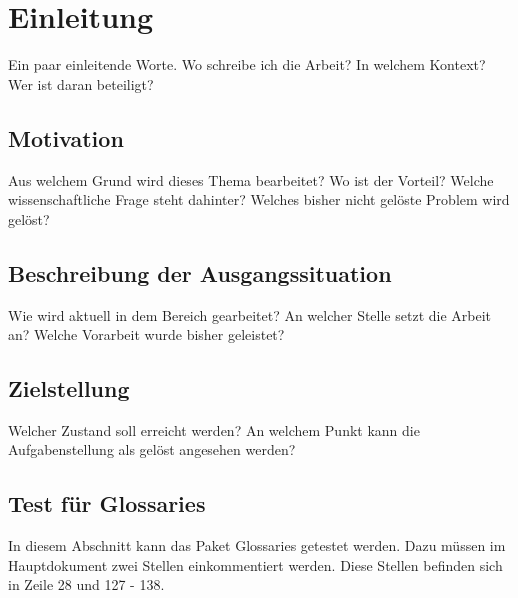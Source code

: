 


\section{Einleitung}

Ein paar einleitende Worte. Wo schreibe ich die Arbeit? In welchem Kontext? Wer ist daran beteiligt?


	\subsection{Motivation}
	
	Aus welchem Grund wird dieses Thema bearbeitet? Wo ist der Vorteil? Welche wissenschaftliche Frage steht dahinter? Welches bisher nicht gelöste Problem wird gelöst?
	

	\subsection{Beschreibung der Ausgangssituation}
	
	Wie wird aktuell in dem Bereich gearbeitet? An welcher Stelle setzt die Arbeit an? Welche Vorarbeit wurde bisher geleistet?
	
	
	\subsection{Zielstellung} \label{sec:Zielstellung}
	
	Welcher Zustand soll erreicht werden? An welchem Punkt kann die Aufgabenstellung als gelöst angesehen werden?
	
	
	
	
	
	
	
	\subsection{Test für Glossaries}
	
	In diesem Abschnitt kann das Paket Glossaries getestet werden. Dazu müssen im Hauptdokument zwei Stellen einkommentiert werden. Diese Stellen befinden sich in Zeile 28 und 127 - 138.
	
